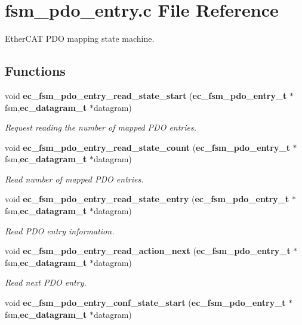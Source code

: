 \section{fsm\-\_\-pdo\-\_\-entry.\-c File Reference}
\label{fsm__pdo__entry_8c}


Ether\-C\-A\-T P\-D\-O mapping state machine.  


\subsection*{Functions}
\begin{DoxyCompactItemize}
\item 
void {\bf ec\-\_\-fsm\-\_\-pdo\-\_\-entry\-\_\-read\-\_\-state\-\_\-start} ({\bf ec\-\_\-fsm\-\_\-pdo\-\_\-entry\-\_\-t} $\ast$fsm,{\bf ec\-\_\-datagram\-\_\-t} $\ast$datagram)
\begin{DoxyCompactList}\small\item\em Request reading the number of mapped P\-D\-O entries. \end{DoxyCompactList}\item 
void {\bf ec\-\_\-fsm\-\_\-pdo\-\_\-entry\-\_\-read\-\_\-state\-\_\-count} ({\bf ec\-\_\-fsm\-\_\-pdo\-\_\-entry\-\_\-t} $\ast$fsm,{\bf ec\-\_\-datagram\-\_\-t} $\ast$datagram)
\begin{DoxyCompactList}\small\item\em Read number of mapped P\-D\-O entries. \end{DoxyCompactList}\item 
void {\bf ec\-\_\-fsm\-\_\-pdo\-\_\-entry\-\_\-read\-\_\-state\-\_\-entry} ({\bf ec\-\_\-fsm\-\_\-pdo\-\_\-entry\-\_\-t} $\ast$fsm,{\bf ec\-\_\-datagram\-\_\-t} $\ast$datagram)
\begin{DoxyCompactList}\small\item\em Read P\-D\-O entry information. \end{DoxyCompactList}\item 
void {\bf ec\-\_\-fsm\-\_\-pdo\-\_\-entry\-\_\-read\-\_\-action\-\_\-next} ({\bf ec\-\_\-fsm\-\_\-pdo\-\_\-entry\-\_\-t} $\ast$fsm,{\bf ec\-\_\-datagram\-\_\-t} $\ast$datagram)
\begin{DoxyCompactList}\small\item\em Read next P\-D\-O entry. \end{DoxyCompactList}\item 
void {\bf ec\-\_\-fsm\-\_\-pdo\-\_\-entry\-\_\-conf\-\_\-state\-\_\-start} ({\bf ec\-\_\-fsm\-\_\-pdo\-\_\-entry\-\_\-t} $\ast$fsm,{\bf ec\-\_\-datagram\-\_\-t} $\ast$datagram)

\end{DoxyCompactItemize}
